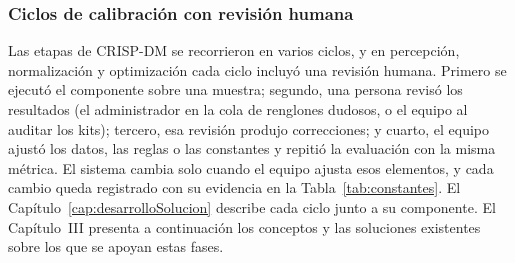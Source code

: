 \subsubsection{Ciclos de calibración con revisión humana}
\label{sec:ciclos-calibracion}

Las etapas de CRISP-DM se recorrieron en varios ciclos, y en percepción, normalización y optimización cada
ciclo incluyó una revisión humana. Primero se ejecutó el componente sobre una muestra; segundo, una persona revisó los resultados (el
administrador en la cola de renglones dudosos, o el equipo al auditar los kits); tercero, esa revisión
produjo correcciones; y cuarto, el equipo ajustó los datos, las reglas o las constantes y repitió la
evaluación con la misma métrica. El sistema cambia solo cuando el equipo ajusta esos elementos, y cada cambio queda registrado con su evidencia en la Tabla~\ref{tab:constantes}.
El
Capítulo~\ref{cap:desarrolloSolucion} describe cada ciclo junto a su componente. El Capítulo~III presenta a continuación los
conceptos y las soluciones existentes sobre los que se apoyan estas fases.\par
